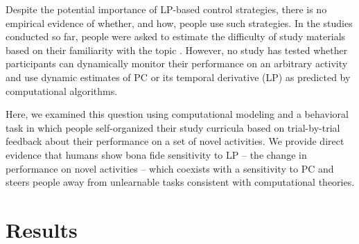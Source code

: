 Despite the potential importance of \ac{LP}-based control strategies, there is no empirical evidence of whether, and how, people use such strategies. In the studies conducted so far, people were asked to estimate the difficulty of study materials based on their familiarity with the topic \parencite[e.g., biographical text or foreign vocabulary;][]{son_metacognitive_2000}. However, no study has tested whether participants can  dynamically monitor their performance on an arbitrary activity and use dynamic estimates of \ac{PC} or its temporal derivative (\ac{LP}) as predicted by computational algorithms. 

Here, we examined this question using computational modeling and a behavioral task in which people self-organized their study curricula based on trial-by-trial feedback about their performance on a set of novel activities. We provide direct evidence that humans show bona fide sensitivity to \ac{LP} – the change in performance on novel activities – which coexists with a sensitivity to \ac{PC} and steers people away from unlearnable tasks consistent with computational theories. 

\section{Results}\label{CH4_S_results}
    
